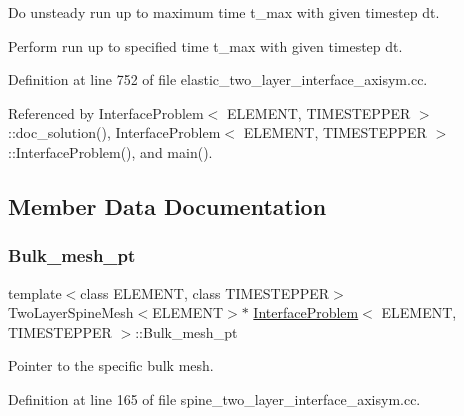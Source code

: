 Do unsteady run up to maximum time t\+\_\+max with given timestep dt. 

Perform run up to specified time t\+\_\+max with given timestep dt. 

Definition at line 752 of file elastic\+\_\+two\+\_\+layer\+\_\+interface\+\_\+axisym.\+cc.



Referenced by Interface\+Problem$<$ E\+L\+E\+M\+E\+N\+T, T\+I\+M\+E\+S\+T\+E\+P\+P\+E\+R $>$\+::doc\+\_\+solution(), Interface\+Problem$<$ E\+L\+E\+M\+E\+N\+T, T\+I\+M\+E\+S\+T\+E\+P\+P\+E\+R $>$\+::\+Interface\+Problem(), and main().



\subsection{Member Data Documentation}
\mbox{\label{classInterfaceProblem_a1e9cf118e6c477ea9a1a49610bb72174}} 
\subsubsection{\texorpdfstring{Bulk\+\_\+mesh\+\_\+pt}{Bulk\_mesh\_pt}\hspace{0.1cm}{\footnotesize\ttfamily [1/2]}}
{\footnotesize\ttfamily template$<$class E\+L\+E\+M\+E\+NT, class T\+I\+M\+E\+S\+T\+E\+P\+P\+ER$>$ \\
Two\+Layer\+Spine\+Mesh$<$E\+L\+E\+M\+E\+NT$>$$\ast$ \hyperlink{classInterfaceProblem}{Interface\+Problem}$<$ E\+L\+E\+M\+E\+NT, T\+I\+M\+E\+S\+T\+E\+P\+P\+ER $>$\+::Bulk\+\_\+mesh\+\_\+pt\hspace{0.3cm}{\ttfamily [private]}}



Pointer to the specific bulk mesh. 



Definition at line 165 of file spine\+\_\+two\+\_\+layer\+\_\+interface\+\_\+axisym.\+cc.

\mbox{\label{classInterfaceProblem_ad7cdca485f230393096667bf0709ef8d}} 
